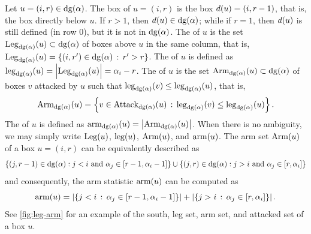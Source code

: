 Let \(u = (i, r) \in \dg(\alpha)\).
The box  of \(u = (i, r)\) is the box \(d(u) = (i, r-1)\), that is, the box directly below \(u\).
If \(r > 1\), then \(\south{u} \in \dg(\alpha)\); while if \(r = 1\), then \(d(u)\) is still defined (in row \(0\)),
but it is not in \(\dg(\alpha)\).
The  of \(u\) is the set \(\Leg_{\dg(\alpha)}(u) \subset \dg(\alpha)\) of boxes above \(u\) in the same column, that is, \(\Leg_{\dg(\alpha)}(u) = \left\{ (i, r') \in \dg(\alpha) \suchthat r' > r \right\}\).
The  of \(u\) is defined as \(\leg_{\dg(\alpha)}(u) = \left|\Leg_{\dg(\alpha)}(u)\right| = \alpha_i - r\).
The  of \(u\) is the set \(\Arm_{\dg(\alpha)}(u) \subset \dg(\alpha)\) of boxes \(v\) attacked by \(u\) such that \(\leg_{\dg(\alpha)}(v) \leq \leg_{\dg(\alpha)}(u)\), that is,
\begin{equation*}
	\Arm_{\dg(\alpha)}(u) = \left\{ v \in \Attack_{\dg(\alpha)}(u) \suchthat \leg_{\dg(\alpha)}(v) \leq \leg_{\dg(\alpha)}(u) \right\}.
\end{equation*}
The  of \(u\) is defined as \(\arm_{\dg(\alpha)}(u) = \left|\Arm_{\dg(\alpha)}(u)\right|\).
When there is no ambiguity, we may simply write \(\operatorname{Leg}(u)\), \(\operatorname{leg}(u)\), \(\operatorname{Arm}(u)\), and \(\operatorname{arm}(u)\).
The arm set \(\operatorname{Arm}(u)\) of a box \(u = (i, r)\) can be equivalently described as
\begin{equation*}
	\{(j, r-1) \in \dg(\alpha) : j < i \text{ and } \alpha_j \in \interval{r-1, \alpha_i-1}\}
	\cup
	\{(j, r) \in \dg(\alpha) : j > i \text{ and } \alpha_j \in \interval{r, \alpha_i}\}
\end{equation*}
and consequently, the arm statistic \(\operatorname{arm}(u)\) can be computed as
\begin{equation*}
	\operatorname{arm}(u) = \left| \{j < i \,:\, \alpha_j \in [r-1, \alpha_i-1]\} \right|
	+ \left| \{j > i \,:\, \alpha_j \in [r, \alpha_i]\} \right|.
\end{equation*}
See \cref{fig:leg-arm} for an example of the south, leg set, arm set, and attacked set of a box \(u\).

